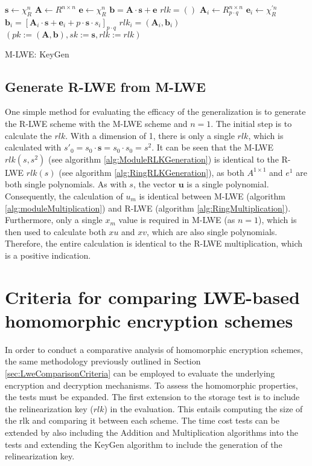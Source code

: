 \begin{algorithm}[htb]
  \begin{algorithmic}[1]
    \STATE $\textbf{s} \leftarrow \chi_R^n$
    \STATE $\textbf{A} \leftarrow R^{n \times n}$
    \STATE $\textbf{e} \leftarrow \chi_R^n$
    \STATE $\textbf{b} = \textbf{A}\cdot \textbf{s}+\textbf{e}$
    \STATE $rlk = ()$
      \STATE $\textbf{A}_i \leftarrow R_{p \cdot q}^{n \times n}$
      \STATE $\textbf{e}_i \leftarrow \chi_R^{'n}$
      \STATE $\textbf{b}_i = [\textbf{A}_i\cdot \textbf{s}+\textbf{e}_i+p\cdot \textbf{s} \cdot s_i]_{p \cdot q}$
      \STATE $rlk_i = (\textbf{A}_i, \textbf{b}_i)$
    \ENDFOR
    \RETURN $(pk:=(\textbf{A}, \textbf{b}), sk:=\textbf{s}, rlk:= rlk )$
  \end{algorithmic}
  \caption{M-LWE: KeyGen}
  \label{alg:HomomorphKeyGen}
\end{algorithm}

\subsection*{Generate R-LWE from M-LWE}

One simple method for evaluating the efficacy of the generalization is to generate the R-LWE scheme with the M-LWE scheme and $n=1$. The initial step is to calculate the $rlk$. With a dimension of 1, there is only a single $rlk$, which is calculated with $s'_0 = s_0 \cdot \textbf{s} = s_0 \cdot s_0 = s^2$. It can be seen that the M-LWE $rlk(s, s^2)$ (see algorithm \ref{alg:ModuleRLKGeneration}) is identical to the R-LWE $rlk(s)$ (see algorithm \ref{alg:RingRLKGeneration}), as both $A^{1 \times 1}$ and $e^1$ are both single polynomials. As with $s$, the vector $\textbf{u}$ is a single polynomial. Consequently, the calculation of $u_m$ is identical between M-LWE (algorithm \ref{alg:moduleMultiplication}) and R-LWE (algorithm \ref{alg:RingMultiplication}). Furthermore, only a single $x_m$ value is required in M-LWE (as $n=1$), which is then used to calculate both $xu$ and $xv$, which are also single polynomials. Therefore, the entire calculation is identical to the R-LWE multiplication, which is a positive indication.


\section{Criteria for comparing LWE-based homomorphic encryption schemes}
\label{sec:HomomorphCriteria}

In order to conduct a comparative analysis of homomorphic encryption schemes, the same methodology previously outlined in Section \ref{sec:LweComparisonCriteria} can be employed to evaluate the underlying encryption and decryption mechanisms. To assess the homomorphic properties, the tests must be expanded. The first extension to the storage test is to include the relinearization key ($rlk$) in the evaluation. This entails computing the size of the rlk and comparing it between each scheme. The time cost tests can be extended by also including the Addition and Multiplication algorithms into the tests and extending the KeyGen algorithm to include the generation of the relinearization key.

